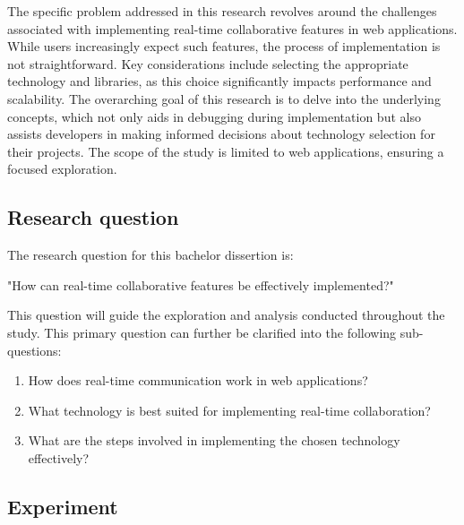 The specific problem addressed in this research revolves around the challenges associated with implementing real-time collaborative features in web applications. While users increasingly expect such features, the process of implementation is not straightforward. Key considerations include selecting the appropriate technology and libraries, as this choice significantly impacts performance and scalability. The overarching goal of this research is to delve into the underlying concepts, which not only aids in debugging during implementation but also assists developers in making informed decisions about technology selection for their projects. The scope of the study is limited to web applications, ensuring a focused exploration.

\subsection{Research question}

The research question for this bachelor dissertion is:

"How can real-time collaborative features be effectively implemented?"

This question will guide the exploration and analysis conducted throughout the study. This primary question can further be clarified into the following sub-questions:

\begin{enumerate}
    \item How does real-time communication work in web applications?
    \item What technology is best suited for implementing real-time collaboration?
    \item What are the steps involved in implementing the chosen technology effectively?
\end{enumerate}



\subsection{Experiment}
